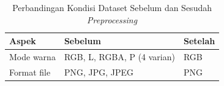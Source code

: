 \begin{table}[H]
	\centering
	\caption{Perbandingan Kondisi Dataset Sebelum dan Sesudah \textit{Preprocessing}}
	\label{tab:preprocessing}
	\begin{tabular}{|l|l|l|}
		\hline
		\textbf{Aspek} & \textbf{Sebelum} & \textbf{Setelah} \\ \hline
		Mode warna & RGB, L, RGBA, P (4 varian) & RGB \\ \hline
		Format file & PNG, JPG, JPEG & PNG \\ \hline
	\end{tabular}
\end{table}